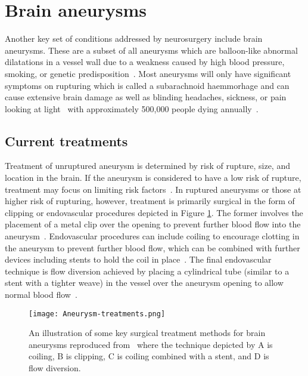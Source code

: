 \section{Brain aneurysms}\label{sec:aneurysms}
Another key set of conditions addressed by neurosurgery include brain aneurysms. These are a subset of all aneurysms which are balloon-like abnormal dilatations in a vessel wall due to a weakness caused by high blood pressure, smoking, or genetic predisposition~\cite{NationalHealthService2022}. Most aneurysms will only have significant symptoms on rupturing which is called a subarachnoid haemmorhage and can cause extensive brain damage as well as blinding headaches, sickness, or pain looking at light~\cite{NationalHealthService2022} with approximately 500,000 people dying annually~\cite{Toth2018}. 

\subsection{Current treatments}\label{sec:introaneurysmtreatments}
Treatment of unruptured aneurysm is determined by risk of rupture, size, and location in the brain. If the aneurysm is considered to have a low risk of rupture, treatment may focus on limiting risk factors~\cite{NationalHealthService2022}. In ruptured aneurysms or those at higher risk of rupturing, however, treatment is primarily surgical in the form of clipping or endovascular procedures depicted in Figure \ref{fig:aneurysmtreatment}. The former involves the placement of a metal clip over the opening to prevent further blood flow into the aneurysm~\cite{TheBrainFoundation2023}. Endovascular procedures can include coiling to encourage clotting in the aneurysm to prevent further blood flow, which can be combined with further devices including stents to hold the coil in place~\cite{TheBrainFoundation2023}. The final endovascular technique is flow diversion achieved by placing a cylindrical tube (similar to a stent with a tighter weave) in the vessel over the aneurysm opening to allow normal blood flow~\cite{TheBrainFoundation2023}. 
\begin{figure}[h]
    \centering
    \texttt{[image: Aneurysm-treatments.png]}
    \caption{An illustration of some key surgical treatment methods for brain aneurysms reproduced from~\cite{TheBrainFoundation2023} where the technique depicted by A is coiling, B is clipping, C is coiling combined with a stent, and D is flow diversion.}
    \label{fig:aneurysmtreatment}
\end{figure}
